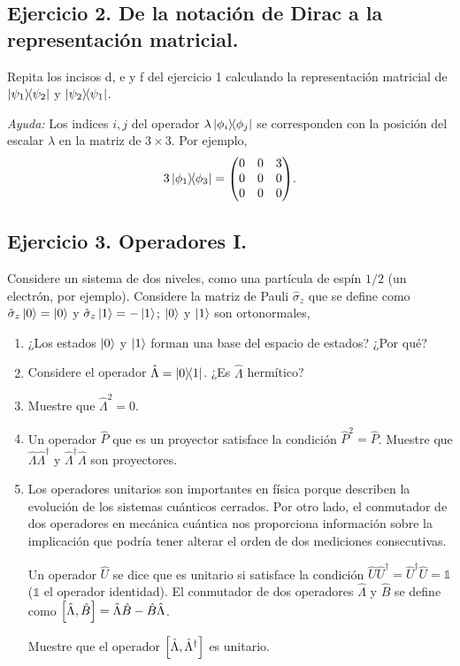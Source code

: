 \documentclass[11pt,letterpaper]{article}
\begin{document}
\subsection*{Ejercicio 2. De la notación de Dirac a la representación
matricial.}
Repita los incisos d, e y f del ejercicio 1 calculando la representación matricial 
de $\dyad{\psi_1}{\psi_2}$ y $\dyad{\psi_2}{\psi_1}$.\newline

\textit{Ayuda:} Los indices $i,j$ del operador $\lambda \dyad{\phi_i}{\phi_j}$ se 
corresponden con la posición del escalar $\lambda$ en la matriz de $3\times 3$.
Por ejemplo, 
\begin{align}
3\dyad{\phi_1}{\phi_3}=\mqty(0&0&3\\0&0&0\\0&0&0).
\end{align}

\subsection*{Ejercicio 3. Operadores I.}
Considere un sistema de dos niveles, como una partícula de espín $1/2$ (un 
electrón, por ejemplo). Considere la matriz de Pauli $\hat \sigma_z$ que se define 
como $\hat \sigma_z\ket{0}=\ket{0}$ y $\hat \sigma_z\ket{1}=-\ket{1}$; $\ket{0}$ 
y $\ket{1}$ son ortonormales,
\begin{enumerate}
\item ¿Los estados $\ket{0}$ y $\ket{1}$ forman una base del espacio
de estados? ¿Por qué?
\item Considere el operador $\hat \Lambda=\dyad{0}{1}$. ¿Es $\hat \Lambda$ hermítico?
\item Muestre que $\hat \Lambda^2=0$.
\item Un operador $\hat P$ que es un proyector satisface la condición
$\hat P^2=\hat P$. Muestre que $\hat \Lambda \hat \Lambda^{\dagger}$ y 
$\hat \Lambda^{\dagger} \hat \Lambda$ son proyectores.
\item Los operadores unitarios son importantes en física porque describen 
la evolución de los sistemas cuánticos cerrados. Por otro lado, el conmutador 
de dos operadores en mecánica cuántica nos proporciona información sobre 
la implicación que podría tener alterar el orden de dos mediciones consecutivas.

Un operador $\hat U$ se dice que es unitario si satisface la condición
$\hat U\hat U^{\dagger}=\hat U^{\dagger}\hat U=\mathds{1}$ ($\mathds{1}$ el operador identidad).
El conmutador de dos operadores $\hat \Lambda$ y $\hat B$ se define como
$\comm{\hat \Lambda}{\hat B}=\hat \Lambda\hat B-\hat B\hat \Lambda$. 

Muestre que el operador $\comm{\hat \Lambda}{\hat\Lambda^{\dagger}}$ es unitario.
\end{enumerate}
\end{document}
